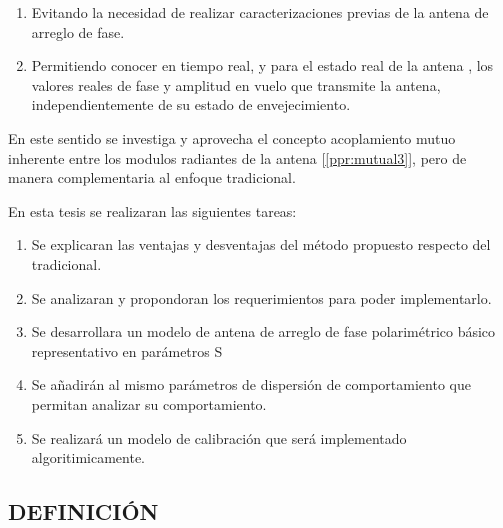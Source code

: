 \documentclass[a4paper,10pt]{article}
\begin{document}
\begin{enumerate}
    \item Evitando la necesidad de realizar caracterizaciones previas de la 
antena de arreglo de fase.
    \item Permitiendo conocer en tiempo real, y para el estado real de la antena
, los valores reales de fase y amplitud en vuelo que transmite la antena, 
independientemente de su estado de envejecimiento.
\end{enumerate}

En este sentido se investiga y aprovecha el concepto acoplamiento mutuo 
inherente entre los modulos radiantes de la antena [\ref{ppr:mutual3}], pero de
manera complementaria al enfoque tradicional. 

En esta tesis se realizaran las siguientes tareas:

\begin{enumerate}
    \item Se explicaran las ventajas y desventajas del método propuesto respecto
del tradicional.
    \item Se analizaran y propondoran los requerimientos para poder 
implementarlo.
    \item Se desarrollara un modelo de antena de arreglo de fase polarimétrico 
básico representativo en parámetros S 
    \item Se añadirán al mismo parámetros de dispersión de comportamiento que 
permitan analizar su comportamiento.
    \item Se realizará un modelo de calibración que será implementado 
algoritimicamente.
\end{enumerate}

\subsection{DEFINICIÓN}
\end{document}
